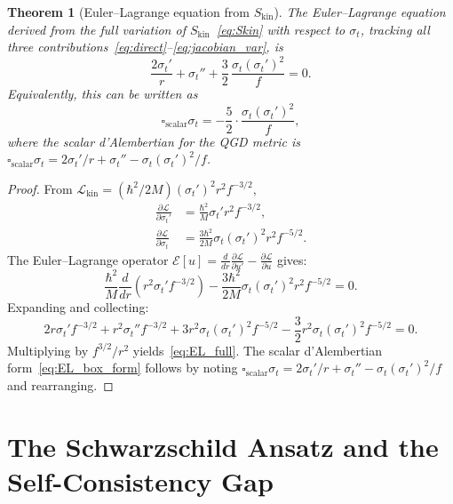\documentclass[11pt,a4paper]{article}
\theoremstyle{plain}
\newtheorem{theorem}{Theorem}[section]
\theoremstyle{definition}
\newcommand{\sigt}{\sigma_t}
\newcommand{\Skin}{S_{\mathrm{kin}}}
\begin{document}
\begin{theorem}[Euler--Lagrange equation from $\Skin$]\label{thm:EL}
The Euler--Lagrange equation derived from the full variation of
$\Skin$~\eqref{eq:Skin} with respect to $\sigt$, tracking all three
contributions~\eqref{eq:direct}--\eqref{eq:jacobian_var}, is
\begin{equation}\label{eq:EL_full}
  \boxed{
    \frac{2\sigt'}{r} + \sigt'' + \frac{3}{2}\,\frac{\sigt(\sigt')^2}{f} = 0.
  }
\end{equation}
Equivalently, this can be written as
\begin{equation}\label{eq:EL_box_form}
  \square_{\mathrm{scalar}}\sigt
  = -\frac{5}{2}\cdot\frac{\sigt(\sigt')^2}{f},
\end{equation}
where the scalar d'Alembertian for the QGD metric is
$\square_{\mathrm{scalar}}\sigt = 2\sigt'/r + \sigt'' - \sigt(\sigt')^2/f$.
\end{theorem}

\begin{proof}
From $\mathcal{L}_{\mathrm{kin}} = (\hbar^2/2M)(\sigt')^2 r^2 f^{-3/2}$,
\begin{align*}
  \frac{\partial\mathcal{L}}{\partial\sigt'}
  &= \frac{\hbar^2}{M}\sigt' r^2 f^{-3/2}, \\[4pt]
  \frac{\partial\mathcal{L}}{\partial\sigt}
  &= \frac{3\hbar^2}{2M}\sigt(\sigt')^2 r^2 f^{-5/2}.
\end{align*}
The Euler--Lagrange operator $\mathcal{E}[u]
  = \frac{d}{dr}\frac{\partial\mathcal{L}}{\partial u'}
  - \frac{\partial\mathcal{L}}{\partial u}$ gives:
\[
  \frac{\hbar^2}{M}\frac{d}{dr}\!\left(r^2\sigt' f^{-3/2}\right)
  - \frac{3\hbar^2}{2M}\sigt(\sigt')^2 r^2 f^{-5/2} = 0.
\]
Expanding and collecting:
\[
  2r\sigt' f^{-3/2}
  + r^2\sigt'' f^{-3/2}
  + 3r^2\sigt(\sigt')^2 f^{-5/2}
  - \frac{3}{2}r^2\sigt(\sigt')^2 f^{-5/2} = 0.
\]
Multiplying by $f^{3/2}/r^2$ yields~\eqref{eq:EL_full}.  The scalar
d'Alembertian form~\eqref{eq:EL_box_form} follows by noting
$\square_{\mathrm{scalar}}\sigt = 2\sigt'/r + \sigt'' - \sigt(\sigt')^2/f$
and rearranging.
\end{proof}

\section{The Schwarzschild Ansatz and the Self-Consistency Gap}
\end{document}
